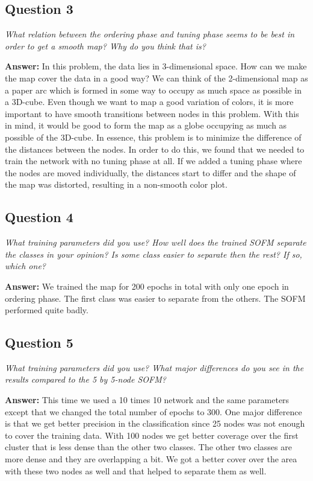\documentclass[a4paper]{article}
\begin{document}
\subsection*{Question 3}
\emph{What relation between the ordering phase and tuning phase seems to be best in order to get a smooth map? Why do you think that is?}

\textbf{Answer:} 
In this problem, the data lies in 3-dimensional space. How can we make the map cover the data in a good way? We can think of the 2-dimensional map as a paper arc which is formed  in some way to occupy as much space as possible in a 3D-cube. Even though we want to map a good variation of colors, it is more important to have smooth transitions between nodes in this problem. With this in mind, it would be good to form the map as a globe occupying as much as possible of the 3D-cube. In essence, this problem is to minimize the difference of the distances between the nodes. In order to do this, we found that we needed to train the network with no tuning phase at all. If we added a tuning phase where the nodes are moved individually, the distances start to differ and the shape of the map was distorted, resulting in a non-smooth color plot.

\subsection*{Question 4}
\emph{What training parameters did you use? How well does the trained
SOFM separate the classes in your opinion? Is some class easier to separate then the rest? If so, which one?}

\textbf{Answer:} We trained the map for 200 epochs in total with only one epoch in ordering phase. The first class was easier to separate from the others. The SOFM performed quite badly. 

\subsection*{Question 5}
\emph{What training parameters did you use? What  major differences
do you see in the results compared to the 5 by 5-node SOFM?}

\textbf{Answer:} This time we used a 10 times 10 network and the same parameters except that we changed the total number of epochs to 300. One major difference is that we get better precision in the classification since 25 nodes was not enough to cover the training data. With 100 nodes we get better coverage over the first cluster that is less dense than the other two classes. The other two classes are more dense and they are overlapping a bit. We got a better cover over the area with these two nodes as well and that helped to separate them as well.
\end{document}
